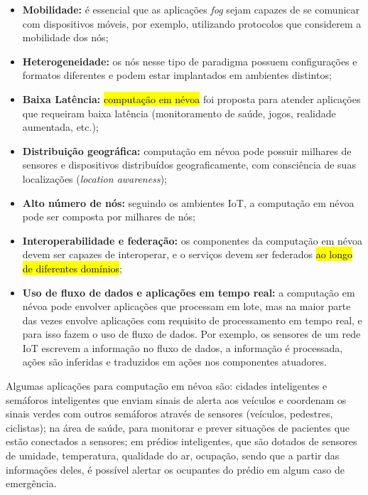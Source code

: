 \begin{itemize}

    \item \textbf{Mobilidade:} é essencial que as aplicações \emph{fog} sejam
    capazes de se comunicar com dispositivos móveis, por exemplo, utilizando
    protocolos que considerem a mobilidade dos nós;

    \item \textbf{Heterogeneidade:} os nós nesse tipo de paradigma possuem
    configurações e formatos diferentes e podem estar implantados em ambientes
    distintos;

    \item \textbf{Baixa Latência:} \hl{computação em névoa} foi proposta para
    atender aplicações que requeiram baixa latência (monitoramento de saúde,
    jogos, realidade aumentada, etc.);

    \item \textbf{Distribuição geográfica:} computação em névoa pode possuir
    milhares de sensores e dispositivos distribuídos geograficamente, com
    consciência de suas localizações (\emph{location awareness});

    \item \textbf{Alto número de nós:} seguindo os ambientes IoT, a computação
    em névoa pode ser composta por milhares de nós;

    \item \textbf{Interoperabilidade e federação:} os componentes da computação
    em névoa devem ser capazes de interoperar, e o serviços devem ser federados
    \hl{ao longo de diferentes domínios};

    \item \textbf{Uso de fluxo de dados e aplicações em tempo real:} a
    computação em névoa pode envolver aplicações que processam em lote, mas na
    maior parte das vezes envolve aplicações com requisito de processamento em
    tempo real, e para isso fazem o uso de fluxo de dados. Por exemplo, os
    sensores de um rede IoT escrevem a informação no fluxo de dados, a
    informação é processada, ações são inferidas e traduzidos em
    ações nos componentes atuadores.

\end{itemize}

Algumas aplicações para computação em névoa são:
cidades inteligentes e
semáforos inteligentes que enviam sinais de alerta aos veículos e coordenam os
sinais verdes com outros semáforos através de sensores (veículos, pedestres,
ciclistas);
na área de saúde, para monitorar e prever situações de pacientes que
estão conectados a sensores;
em prédios inteligentes, que são dotados de sensores
de umidade, temperatura, qualidade do ar, ocupação, sendo que a partir das
informações deles, é possível alertar os ocupantes do prédio em algum caso de
emergência.

